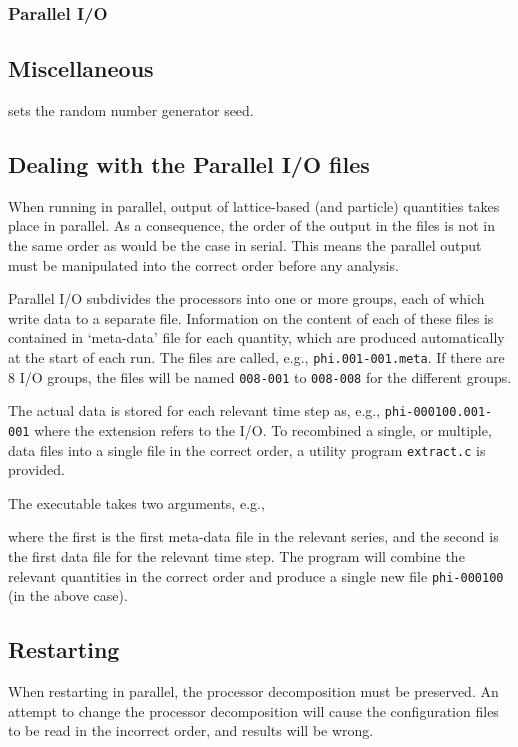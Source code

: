 \subsubsection{Parallel I/O}


\subsection{Miscellaneous}


sets the random number generator seed.

\subsection{Dealing with the Parallel I/O files}

When running in parallel, output of lattice-based (and particle)
quantities takes place in parallel. As a consequence, the order
of the output in the files is not in the same order as would be
the case in serial. This means the parallel output must be
manipulated into the correct order before any analysis.

Parallel I/O subdivides the processors into one or more groups,
each of which write data to a separate file. Information on the
content of each of these files is contained in `meta-data' file
for each quantity, which are produced automatically at the start
of each run. The files are called, e.g., \texttt{phi.001-001.meta}.
If there are 8 I/O groups, the files will be named \texttt{008-001}
to \texttt{008-008} for the different groups.

The actual data is stored for each relevant time step as, e.g.,
\texttt{phi-000100.001-001} where the extension refers to the
I/O. To recombined a single, or multiple, data files into a
single file in the correct order, a utility program
\texttt{extract.c} is provided.

The executable takes two arguments, e.g.,


where  the first is the first meta-data file in the relevant series,
and the second is the first data file for the relevant time step. The
program will combine the relevant quantities in the correct order
and produce a single new file \texttt{phi-000100} (in the above case).

\subsection{Restarting}

When restarting in parallel, the processor decomposition must be
preserved. An attempt to change the processor decomposition will
cause the configuration files to be read in the incorrect order,
and results will be wrong.
